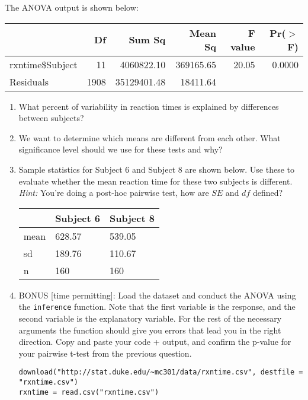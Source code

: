 \documentclass[11pt]{article}
\begin{document}
The ANOVA output is shown below:

\begin{center}
\begin{tabular}{lrrrrr}
  \hline
 & Df & Sum Sq & Mean Sq & F value & Pr($>$F) \\ 
  \hline
rxntime\$Subject & 11 & 4060822.10 & 369165.65 & 20.05 & 0.0000 \\ 
  Residuals & 1908 & 35129401.48 & 18411.64 &  &  \\ 
   \hline
\end{tabular}
\end{center}

%

\begin{enumerate}

\item What percent of variability in reaction times is explained by differences between subjects?

\item We want to determine which means are different from each other. What significance level should we use for these tests and why?

\item Sample statistics for Subject 6 and Subject 8 are shown below. Use these to evaluate whether the mean reaction time for these two subjects is different. \textit{Hint:} You're doing a post-hoc pairwise test, how are $SE$ and $df$ defined?

\begin{center}
\begin{tabular}{lll}
  \hline
 & Subject 6 & Subject 8 \\ 
  \hline
  mean & 628.57 & 539.05 \\ 
  sd & 189.76 & 110.67 \\ 
  n & 160 & 160 \\ 
   \hline
\end{tabular}
\end{center}

\item BONUS [time permitting]: Load the dataset and conduct the ANOVA using the \texttt{inference} function. Note that the first variable is the response, and the second variable is the explanatory variable. For the rest of the necessary arguments the function should give you errors that lead you in the right direction. Copy and paste your code + output, and confirm the p-value for your pairwise t-test from the previous question.

\begin{verbatim}
download("http://stat.duke.edu/~mc301/data/rxntime.csv", destfile = "rxntime.csv")
rxntime = read.csv("rxntime.csv")
\end{verbatim}

\end{enumerate}

%
\end{document}
